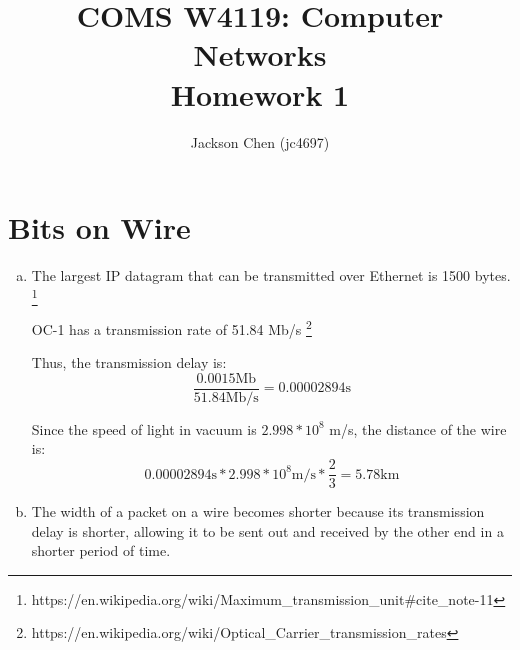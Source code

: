 \documentclass[11pt]{article}
\begin{document}

\title{COMS W4119: Computer Networks\\
       Homework 1}
\author{Jackson Chen (jc4697)} %
\maketitle

\section*{Bits on Wire}
  \begin{enumerate}[(a)]
    \item
      The largest IP datagram that can be transmitted over Ethernet is 1500 bytes. \footnote{https://en.wikipedia.org/wiki/Maximum\_transmission\_unit\#cite\_note-11}

      OC-1 has a transmission rate of 51.84 Mb/s \footnote{https://en.wikipedia.org/wiki/Optical\_Carrier\_transmission\_rates}

      Thus, the transmission delay is:
      \[ \frac{0.0015 \text{Mb}}{51.84 \text{Mb/s}} = 0.00002894 \text{s} \]

      Since the speed of light in vacuum is $2.998 * 10^8$ m/s, the distance of the wire is:
      \[ 0.00002894 \text{s} * 2.998 * 10^8 \text{m/s} * \frac{2}{3} = \boxed{5.78 \text{km}} \]
    \item
      The width of a packet on a wire becomes shorter because its transmission
      delay is shorter, allowing it to be sent out and received by the other
      end in a shorter period of time.
  \end{enumerate}
\end{document}
